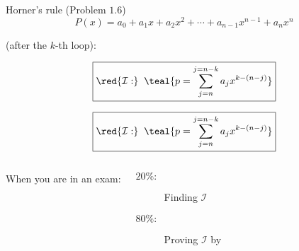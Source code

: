 
\begin{frame}{}
  \centerline{\Large {}}

\end{frame}

\begin{frame}{}
  \begin{exampleblock}{Horner's rule (Problem $1.6$)}
    \[
      P(x) = a_0 + a_1 x + a_2 x^2 + \cdots + a_{n-1} x^{n-1} + a_n x^n
    \]

    
  \end{exampleblock}

  \pause
  \vspace{0.50cm}
  \centerline{ (after the $k$-th loop):}
  \pause
  \[
    \boxed{\red{\mathcal{I}:}\;\; \teal{p = \sum_{j = n}^{j = n-k} a_j x^{k-(n-j)}}}
  \]
\end{frame}

\begin{frame}{}
  \[
    \boxed{\red{\mathcal{I}:}\;\; \teal{p = \sum_{j = n}^{j = n-k} a_j x^{k-(n-j)}}}
  \]

  \vspace{0.50cm}
  \begin{columns}
      \pause
      \qquad When you are in an exam:\\[5pt]
      \begin{description}
	\item[$20\%:$] Finding $\mathcal{I}$
	\item[$80\%:$] Proving $\mathcal{I}$ by 
      \end{description}
  \end{columns}
\end{frame}

